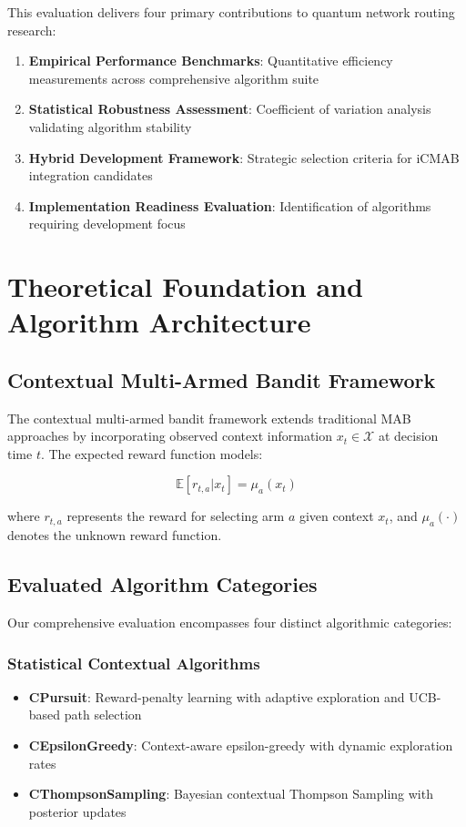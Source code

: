 \documentclass[12pt,a4paper]{article}
\begin{document}
This evaluation delivers four primary contributions to quantum network routing research:

\begin{enumerate}
\item \textbf{Empirical Performance Benchmarks}: Quantitative efficiency measurements across comprehensive algorithm suite
\item \textbf{Statistical Robustness Assessment}: Coefficient of variation analysis validating algorithm stability
\item \textbf{Hybrid Development Framework}: Strategic selection criteria for iCMAB integration candidates
\item \textbf{Implementation Readiness Evaluation}: Identification of algorithms requiring development focus
\end{enumerate}

\section{Theoretical Foundation and Algorithm Architecture}

\subsection{Contextual Multi-Armed Bandit Framework}

The contextual multi-armed bandit framework extends traditional MAB approaches by incorporating observed context information $x_t \in \mathcal{X}$ at decision time $t$. The expected reward function models:

\begin{equation}
\mathbb{E}[r_{t,a} | x_t] = \mu_a(x_t)
\end{equation}

where $r_{t,a}$ represents the reward for selecting arm $a$ given context $x_t$, and $\mu_a(\cdot)$ denotes the unknown reward function.

\subsection{Evaluated Algorithm Categories}

Our comprehensive evaluation encompasses four distinct algorithmic categories:

\subsubsection{Statistical Contextual Algorithms}
\begin{itemize}
\item \textbf{CPursuit}: Reward-penalty learning with adaptive exploration and UCB-based path selection
\item \textbf{CEpsilonGreedy}: Context-aware epsilon-greedy with dynamic exploration rates
\item \textbf{CThompsonSampling}: Bayesian contextual Thompson Sampling with posterior updates
\end{itemize}
\end{document}
